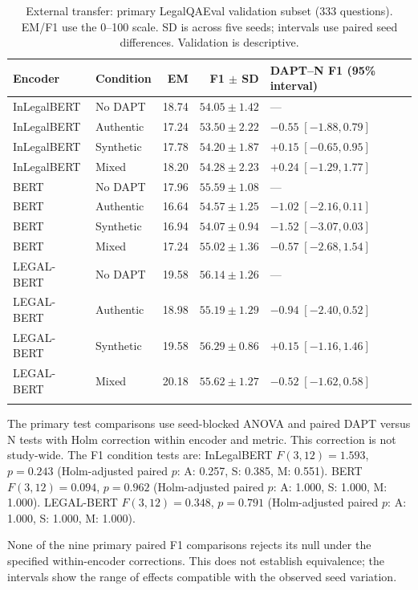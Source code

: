 \begin{table}[!htbp]
\caption{External transfer: primary LegalQAEval validation subset (333 questions).
EM/F1 use the 0--100 scale. SD is across five seeds; intervals
use paired seed differences. Validation is descriptive.}
\label{tab:legalqaeval_val}
\centering\scriptsize
\setlength{\tabcolsep}{3pt}
\begin{tabular}{@{}llrr>{\raggedright\arraybackslash}p{3.8cm}@{}}
\toprule
Encoder & Condition & EM & F1 $\pm$ SD & DAPT--N F1 (95\% interval) \\
\midrule
InLegalBERT & No DAPT & 18.74 & $54.05\pm1.42$ & --- \\
InLegalBERT & Authentic & 17.24 & $53.50\pm2.22$ & $-0.55\;[-1.88,0.79]$ \\
InLegalBERT & Synthetic & 17.78 & $54.20\pm1.87$ & $+0.15\;[-0.65,0.95]$ \\
InLegalBERT & Mixed & 18.20 & $54.28\pm2.23$ & $+0.24\;[-1.29,1.77]$ \\
\addlinespace
BERT & No DAPT & 17.96 & $55.59\pm1.08$ & --- \\
BERT & Authentic & 16.64 & $54.57\pm1.25$ & $-1.02\;[-2.16,0.11]$ \\
BERT & Synthetic & 16.94 & $54.07\pm0.94$ & $-1.52\;[-3.07,0.03]$ \\
BERT & Mixed & 17.24 & $55.02\pm1.36$ & $-0.57\;[-2.68,1.54]$ \\
\addlinespace
LEGAL-BERT & No DAPT & 19.58 & $56.14\pm1.26$ & --- \\
LEGAL-BERT & Authentic & 18.98 & $55.19\pm1.29$ & $-0.94\;[-2.40,0.52]$ \\
LEGAL-BERT & Synthetic & 19.58 & $56.29\pm0.86$ & $+0.15\;[-1.16,1.46]$ \\
LEGAL-BERT & Mixed & 20.18 & $55.62\pm1.27$ & $-0.52\;[-1.62,0.58]$ \\
\addlinespace
\bottomrule
\end{tabular}
\end{table}

The primary test comparisons use seed-blocked ANOVA and paired
DAPT versus N tests with Holm correction within encoder and metric.
This correction is not study-wide. The F1 condition tests are:
InLegalBERT $F(3,12)=1.593$, $p=0.243$ (Holm-adjusted paired $p$: A: 0.257, S: 0.385, M: 0.551).
BERT $F(3,12)=0.094$, $p=0.962$ (Holm-adjusted paired $p$: A: 1.000, S: 1.000, M: 1.000).
LEGAL-BERT $F(3,12)=0.348$, $p=0.791$ (Holm-adjusted paired $p$: A: 1.000, S: 1.000, M: 1.000).

None of the nine primary paired F1 comparisons rejects its null
under the specified within-encoder corrections. This does not
establish equivalence; the intervals show the range of effects
compatible with the observed seed variation.

